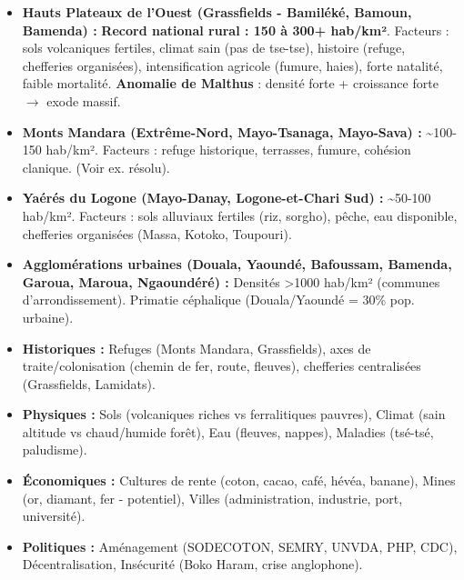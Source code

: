 \documentclass[11pt]{article}
\begin{document}
\begin{description}
    \begin{itemize}
        \item \textbf{Hauts Plateaux de l'Ouest (Grassfields - Bamiléké, Bamoun, Bamenda) :} \textbf{Record national rural : 150 à 300+ hab/km²}. Facteurs : sols volcaniques fertiles, climat sain (pas de tse-tse), histoire (refuge, chefferies organisées), intensification agricole (fumure, haies), forte natalité, faible mortalité. \textbf{Anomalie de Malthus} : densité forte + croissance forte $\rightarrow$ exode massif.
        \item \textbf{Monts Mandara (Extrême-Nord, Mayo-Tsanaga, Mayo-Sava) :} \textasciitilde 100-150 hab/km². Facteurs : refuge historique, terrasses, fumure, cohésion clanique. (Voir ex. résolu).
        \item \textbf{Yaérés du Logone (Mayo-Danay, Logone-et-Chari Sud) :} \textasciitilde 50-100 hab/km². Facteurs : sols alluviaux fertiles (riz, sorgho), pêche, eau disponible, chefferies organisées (Massa, Kotoko, Toupouri).
        \item \textbf{Agglomérations urbaines (Douala, Yaoundé, Bafoussam, Bamenda, Garoua, Maroua, Ngaoundéré) :} Densités \textgreater 1000 hab/km² (communes d'arrondissement). Primatie céphalique (Douala/Yaoundé = 30\% pop. urbaine).
    \end{itemize}
\end{description}

\begin{aretenir}
\begin{itemize}
    \item \textbf{Historiques :} Refuges (Monts Mandara, Grassfields), axes de traite/colonisation (chemin de fer, route, fleuves), chefferies centralisées (Grassfields, Lamidats).
    \item \textbf{Physiques :} Sols (volcaniques riches vs ferralitiques pauvres), Climat (sain altitude vs chaud/humide forêt), Eau (fleuves, nappes), Maladies (tsé-tsé, paludisme).
    \item \textbf{Économiques :} Cultures de rente (coton, cacao, café, hévéa, banane), Mines (or, diamant, fer - potentiel), Villes (administration, industrie, port, université).
    \item \textbf{Politiques :} Aménagement (SODECOTON, SEMRY, UNVDA, PHP, CDC), Décentralisation, Insécurité (Boko Haram, crise anglophone).
\end{itemize}
\end{aretenir}
\end{document}
